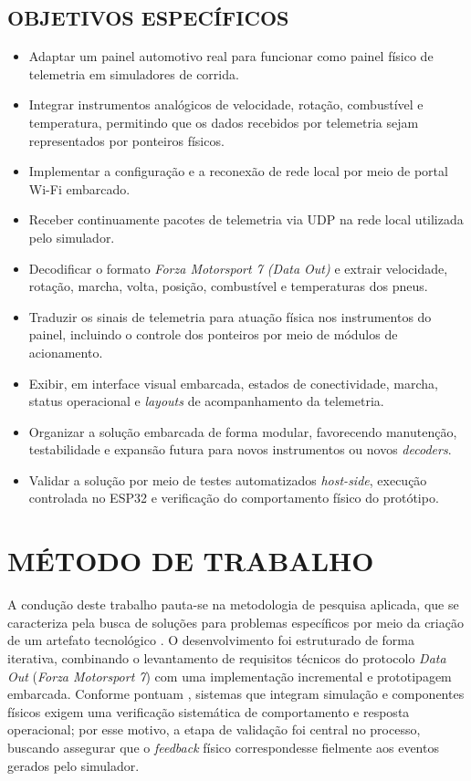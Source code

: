 \documentclass[
  12pt,
  oneside,
  a4paper,
  chapter=TITLE,
  section=TITLE,
  subsection=TITLE,
  brazil
]{abntex2}
\newcommand{\estrangeirismo}[1]{\textit{#1}}
\begin{document}
\subsection{OBJETIVOS ESPECÍFICOS}
\begin{itemize}
  \item Adaptar um painel automotivo real para funcionar como painel físico de telemetria em simuladores de corrida.
  \item Integrar instrumentos analógicos de velocidade, rotação, combustível e temperatura, permitindo que os dados recebidos por telemetria sejam representados por ponteiros físicos.
  \item Implementar a configuração e a reconexão de rede local por meio de portal Wi-Fi embarcado.
  \item Receber continuamente pacotes de telemetria via UDP na rede local utilizada pelo simulador.
  \item Decodificar o formato \estrangeirismo{Forza Motorsport 7 (Data Out)} e extrair velocidade, rotação, marcha, volta, posição, combustível e temperaturas dos pneus.
  \item Traduzir os sinais de telemetria para atuação física nos instrumentos do painel, incluindo o controle dos ponteiros por meio de módulos de acionamento.
  \item Exibir, em interface visual embarcada, estados de conectividade, marcha, status operacional e \estrangeirismo{layouts} de acompanhamento da telemetria.
  \item Organizar a solução embarcada de forma modular, favorecendo manutenção, testabilidade e expansão futura para novos instrumentos ou novos \estrangeirismo{decoders}.
  \item Validar a solução por meio de testes automatizados \estrangeirismo{host-side}, execução controlada no ESP32 e verificação do comportamento físico do protótipo.
\end{itemize}

\section{MÉTODO DE TRABALHO}

A condução deste trabalho pauta-se na metodologia de pesquisa aplicada, que se caracteriza pela busca de soluções para problemas específicos por meio da criação de um artefato tecnológico \cite{wazlawick2017metodologia}. O desenvolvimento foi estruturado de forma iterativa, combinando o levantamento de requisitos técnicos do protocolo \textit{Data Out} (\textit{Forza Motorsport 7}) com uma implementação incremental e prototipagem embarcada. Conforme pontuam , sistemas que integram simulação e componentes físicos exigem uma verificação sistemática de comportamento e resposta operacional; por esse motivo, a etapa de validação foi central no processo, buscando assegurar que o \estrangeirismo{feedback} físico correspondesse fielmente aos eventos gerados pelo simulador.
\end{document}
